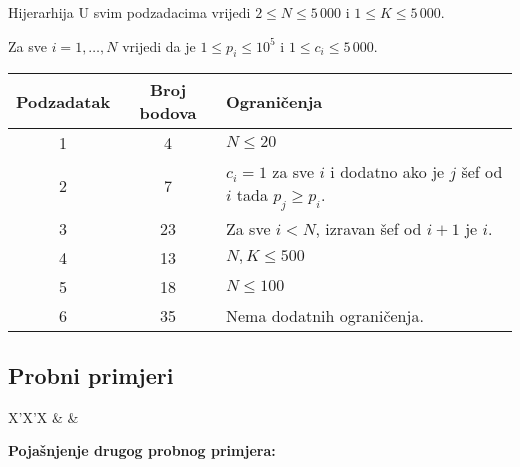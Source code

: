 \begin{statement}[
  problempoints=100,
  timelimit=1 sekunda,
  memorylimit=1024 MiB,
]{Hijerarhija}
U svim podzadacima vrijedi $2 \leq N \leq 5\,000$ i $1 \leq K \leq 5\,000$.

Za sve $i = 1, \dots, N$ vrijedi da je $1 \leq p_i \leq 10^5$ i $1 \leq c_i \leq 5\,000$.

{\renewcommand{\arraystretch}{1.4}
  \setlength{\tabcolsep}{6pt}
  \begin{tabular}{ccl}
   Podzadatak & Broj bodova & Ograničenja \\ \midrule
   	1 & 4 & $N \leq 20$ \\
    2 & 7 & $c_i = 1$ za sve $i$ i dodatno ako je $j$ šef od $i$ tada $p_j \geq p_i$. \\
    3 & 23 & Za sve $i < N$, izravan šef od $i + 1$ je $i$. \\
    4 & 13 & $N, K \leq 500$ \\
    5 & 18 & $N \leq 100$ \\
    6 & 35 & Nema dodatnih ograničenja. \\
\end{tabular}}

\subsection*{Probni primjeri}
\begin{tabularx}{\textwidth}{X'X'X}
 &
 &
\end{tabularx}

\pagebreak

\textbf{Pojašnjenje drugog probnog primjera:}\\


\end{statement}

